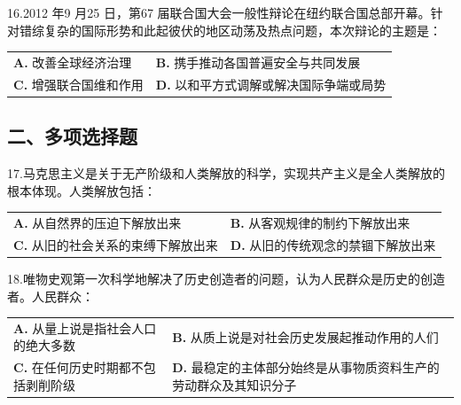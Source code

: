 \documentclass[UTF8,11pt]{ctexart}
\begin{document}
16.2012 年9 月25 日，第67 届联合国大会一般性辩论在纽约联合国总部开幕。针对错综复杂的国际形势和此起彼伏的地区动荡及热点问题，本次辩论的主题是：


\begin{center}\begin{tabular}{>{\raggedright\arraybackslash}p{\dimexpr(\linewidth-4\tabcolsep)/2\relax}>{\raggedright\arraybackslash}p{\dimexpr(\linewidth-4\tabcolsep)/2\relax}}
\textbf{A.} 改善全球经济治理 & \textbf{B.} 携手推动各国普遍安全与共同发展\\[.35em]
\textbf{C.} 增强联合国维和作用 & \textbf{D.} 以和平方式调解或解决国际争端或局势\\[.35em]\end{tabular}\end{center}

\subsection*{二、多项选择题}

17.马克思主义是关于无产阶级和人类解放的科学，实现共产主义是全人类解放的根本体现。人类解放包括：


\begin{center}\begin{tabular}{>{\raggedright\arraybackslash}p{\dimexpr(\linewidth-4\tabcolsep)/2\relax}>{\raggedright\arraybackslash}p{\dimexpr(\linewidth-4\tabcolsep)/2\relax}}
\textbf{A.} 从自然界的压迫下解放出来 & \textbf{B.} 从客观规律的制约下解放出来\\[.35em]
\textbf{C.} 从旧的社会关系的束缚下解放出来 & \textbf{D.} 从旧的传统观念的禁锢下解放出来\\[.35em]\end{tabular}\end{center}

18.唯物史观第一次科学地解决了历史创造者的问题，认为人民群众是历史的创造者。人民群众：


\begin{center}\begin{tabular}{>{\raggedright\arraybackslash}p{\dimexpr(\linewidth-4\tabcolsep)/2\relax}>{\raggedright\arraybackslash}p{\dimexpr(\linewidth-4\tabcolsep)/2\relax}}
\textbf{A.} 从量上说是指社会人口的绝大多数 & \textbf{B.} 从质上说是对社会历史发展起推动作用的人们\\[.35em]
\textbf{C.} 在任何历史时期都不包括剥削阶级 & \textbf{D.} 最稳定的主体部分始终是从事物质资料生产的劳动群众及其知识分子\\[.35em]\end{tabular}\end{center}
\end{document}
